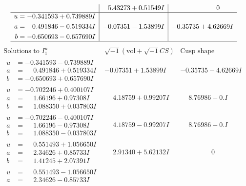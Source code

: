 \documentclass[1p]{elsarticle_modified}
\theoremstyle{definition}
\newcommand{\I}{\sqrt{-1}}
\begin{document}
$$\begin{array}{c|c|c}
 & \phantom{-}5.43273 + 0.51549 I & \phantom{-0.000000 } 0 \\ \hline\begin{aligned}
u &= -0.341593 + 0.739889 I \\
a &= \phantom{-}0.491846 - 0.519334 I \\
b &= -0.650693 - 0.657690 I\end{aligned}
 & -0.07351 - 1.53899 I & -0.35735 + 4.62669 I\\
 \hline 
 \end{array}$$\newpage$$\begin{array}{c|c|c}  
\text{Solutions to }I^u_{1}& \I (\text{vol} + \sqrt{-1}CS) & \text{Cusp shape}\\
 \hline 
\begin{aligned}
u &= -0.341593 - 0.739889 I \\
a &= \phantom{-}0.491846 + 0.519334 I \\
b &= -0.650693 + 0.657690 I\end{aligned}
 & -0.07351 + 1.53899 I & -0.35735 - 4.62669 I \\ \hline\begin{aligned}
u &= -0.702246 + 0.400107 I \\
a &= \phantom{-}1.66196 + 0.97308 I \\
b &= \phantom{-}1.088350 + 0.037803 I\end{aligned}
 & \phantom{-}4.18759 + 0.99207 I & \phantom{-}8.76986 + 0. I\phantom{ +0.000000I} \\ \hline\begin{aligned}
u &= -0.702246 - 0.400107 I \\
a &= \phantom{-}1.66196 - 0.97308 I \\
b &= \phantom{-}1.088350 - 0.037803 I\end{aligned}
 & \phantom{-}4.18759 - 0.99207 I & \phantom{-}8.76986 + 0. I\phantom{ +0.000000I} \\ \hline\begin{aligned}
u &= \phantom{-}0.551493 + 1.056650 I \\
a &= \phantom{-}2.34626 + 0.85733 I \\
b &= \phantom{-}1.41245 + 2.07391 I\end{aligned}
 & \phantom{-}2.91340 + 5.62132 I & \phantom{-0.000000 } 0 \\ \hline\begin{aligned}
u &= \phantom{-}0.551493 - 1.056650 I \\
a &= \phantom{-}2.34626 - 0.85733 I \\

\end{aligned}
\end{array}$$
\end{document}
